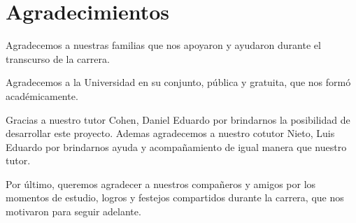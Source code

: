 
\chapter*{Agradecimientos}


Agradecemos a nuestras familias que nos apoyaron y ayudaron durante el transcurso de la carrera.

Agradecemos a la Universidad en su conjunto, pública y gratuita, que nos formó académicamente.

Gracias a nuestro tutor Cohen, Daniel Eduardo por brindarnos la posibilidad de desarrollar este proyecto. Ademas agradecemos a nuestro cotutor Nieto, Luis Eduardo por brindarnos ayuda y acompañamiento de igual manera que nuestro tutor.

Por último, queremos agradecer a nuestros compañeros y amigos por los momentos de estudio, logros y festejos compartidos durante la carrera, que nos motivaron para seguir adelante.

\label{chap:agradecimientos}




